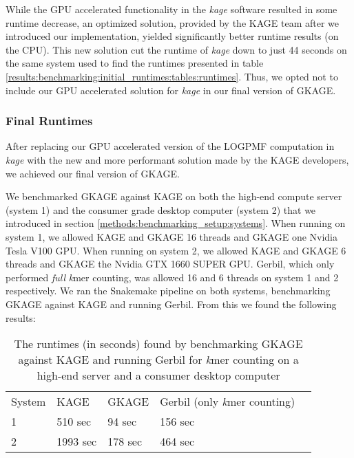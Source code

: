 While the GPU accelerated functionality in the \textit{kage} software resulted in some runtime decrease, an optimized solution, provided by the KAGE team after we introduced our implementation, yielded significantly better runtime results (on the CPU).
This new solution cut the runtime of \textit{kage} down to just 44 seconds on the same system used to find the runtimes presented in table \ref{results:benchmarking:initial_runtimes:tables:runtimes}.
Thus, we opted not to include our GPU accelerated solution for \textit{kage} in our final version of GKAGE.

\subsubsection{Final Runtimes} \label{results:benchmarking:final_runtimes}
After replacing our GPU accelerated version of the LOGPMF computation in \textit{kage} with the new and more performant solution made by the KAGE developers, we achieved our final version of GKAGE.

We benchmarked GKAGE against KAGE on both the high-end compute server (system 1) and the consumer grade desktop computer (system 2) that we introduced in section \ref{methods:benchmarking_setup:systems}.
When running on system 1, we allowed KAGE and GKAGE 16 threads and GKAGE one Nvidia Tesla V100 GPU.
When running on system 2, we allowed KAGE and GKAGE 6 threads and GKAGE the Nvidia GTX 1660 SUPER GPU.
Gerbil, which only performed \textit{full} \textit{k}mer counting, was allowed 16 and 6 threads on system 1 and 2 respectively.
We ran the Snakemake pipeline on both systems, benchmarking GKAGE against KAGE and running Gerbil.
From this we found the following results:

\begin{table}[H]
\begin{center}
\begin{tabular}{lllll}
  \multicolumn{1}{l|}{System} & \multicolumn{1}{l}{KAGE}     & \multicolumn{1}{l}{GKAGE} & \multicolumn{1}{l}{Gerbil (only \textit{k}mer counting)} & \\ \cline{1-4}
\multicolumn{1}{l|}{1}      & \multicolumn{1}{l}{510 sec}  & \multicolumn{1}{l}{94 sec} & \multicolumn{1}{l}{156 sec} & \\
\multicolumn{1}{l|}{2}      & \multicolumn{1}{l}{1993 sec} & \multicolumn{1}{l}{178 sec} & \multicolumn{1}{l}{464 sec} & \\
\end{tabular}
\end{center}
\caption{
  The runtimes (in seconds) found by benchmarking GKAGE against KAGE and running Gerbil for \textit{k}mer counting on a high-end server and a consumer desktop computer
}
\label{results:benchmarking:final_runtimes:tables:runtimes}
\end{table}


